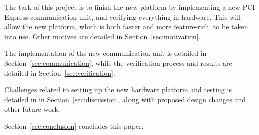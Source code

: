 The task of this project is to finish the new platform by implementing a new PCI Express communication unit, and verifying everything in hardware.
This will allow the new platform, which is both faster and more feature-rich, to be taken into use.
Other motives are detailed in Section~\ref{sec:motivation}.

The implementation of the new communication unit is detailed in Section~\ref{sec:communication}, while the verification process and results are detailed in Section~\ref{sec:verification}.

Challenges related to setting up the new hardware platform and testing is detailed in in Section~\ref{sec:discussion}, along with proposed design changes and other future work.

Section~\ref{sec:conclusion} concludes this paper.

